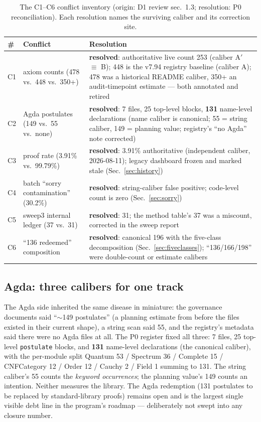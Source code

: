 \begin{table}[t]
\caption{The C1--C6 conflict inventory (origin:
D1 review sec.~1.3; resolution: P0 reconciliation). Each
resolution names the surviving caliber and its correction site.}
\label{tab:conflicts}
\begin{center}
\small
\begin{tabular}{@{}p{0.6cm}p{5.6cm}p{8.2cm}@{}}
\toprule
\# & Conflict & Resolution \\
\midrule
C1 & axiom counts (478 vs.\ 448 vs.\ 350+) & \textbf{resolved}:
authoritative live count 253 (caliber A$'$ $\equiv$ B); 448 is the
v7.94 registry baseline (caliber A); 478 was a historical README
caliber, 350+ an audit-timepoint estimate --- both annotated and
retired \\
C2 & Agda postulates (149 vs.\ 55 vs.\ none) & \textbf{resolved}:
7 files, 25 top-level blocks, \textbf{131} name-level declarations
(name caliber is canonical; 55 = string caliber, 149 = planning
value; registry's ``no Agda'' note corrected) \\
C3 & proof rate (3.91\% vs.\ 99.79\%) & \textbf{resolved}: 3.91\%
authoritative (independent caliber, 2026-08-11); legacy dashboard
frozen and marked stale (Sec.~\ref{sec:history}) \\
C4 & batch ``sorry contamination'' (30.2\%) & \textbf{resolved}:
string-caliber false positive; code-level count is zero
(Sec.~\ref{sec:sorry}) \\
C5 & sweep3 internal ledger (37 vs.\ 31) & \textbf{resolved}: 31;
the method table's 37 was a miscount, corrected in the sweep
report \\
C6 & ``136 redeemed'' composition & \textbf{resolved}: canonical
196 with the five-class decomposition
(Sec.~\ref{sec:fiveclasses}); ``136/166/198'' were double-count or
estimate calibers \\
\bottomrule
\end{tabular}
\end{center}
\end{table}

\subsection{Agda: three calibers for one track}
\label{sec:agda-calibers}
The Agda side inherited the same disease in miniature: the
governance documents said ``$\sim$149 postulates'' (a planning
estimate from before the files existed in their current shape), a
string scan said 55, and the registry's metadata said there were no
Agda files at all. The P0 register fixed all three: 7 files, 25
top-level \texttt{postulate} blocks, and \textbf{131} name-level
declarations (the canonical caliber), with the per-module split
Quantum 53 / Spectrum 36 / Complete 15 / CNFCategory 12 / Order 12
/ Cauchy 2 / Field 1 summing to 131. The string caliber's 55 counts
the \emph{keyword occurrences}; the planning value's 149 counts an
intention. Neither measures the library. The Agda redemption (131
postulates to be replaced by standard-library proofs) remains open
and is the largest single visible debt line in the program's
roadmap --- deliberately not swept into any closure number.


